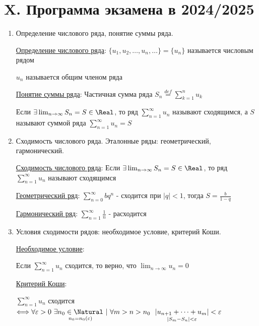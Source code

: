 \documentclass[12pt]{article}
\begin{document}
\clearpage

\section{X. Программа экзамена в 2024/2025}


\begin{enumerate}
\subsection{X.1. Числовые ряды.}

    \item Определение числового ряда, понятие суммы ряда.

    \hyperlink{numberseriesdefinition}{Определение числового ряда}: $\{u_1, u_2, \dots, u_n, \dots\} = \{u_n\}$ называется числовым рядом

    $u_n$ называется общим членом ряда
    
    \hyperlink{sumofseriesdefinition}{Понятие суммы ряда}: Частичная сумма ряда $S_n \stackrel{def}{=} \sum_{k = 1}^{n} u_k$

    Если $\exists \lim_{n \to\infty} S_n = S \in \Real$, то ряд $\sum_{n = 1}^\infty u_n$ называют сходящимся,
    а $S$ называют суммой ряда $\sum_{n = 1}^\infty u_n = S$

    \item Сходимость числового ряда. Эталонные ряды: геометрический, гармонический.

    \hyperlink{seriesconvergence}{Сходимость числового ряда}: Если $\exists \lim_{n \to\infty} S_n = S \in \Real$, то ряд $\sum_{n = 1}^\infty u_n$ называют сходящимся

    \hyperlink{geometricseries}{Геометрический ряд}: $\sum_{n = 0}^\infty b q^n$ - сходится при $|q| < 1$, тогда $S = \frac{b}{1 - q}$
    
    \hyperlink{harmonicseries}{Гармонический ряд}: $\sum_{n = 1}^\infty \frac{1}{n}$ - расходится

    \item Условия сходимости рядов: необходимое условие, критерий Коши.

    \hyperlink{necessarycondition}{Необходимое условие}: 

    \Ths Если $\sum_{n = 1}^\infty u_n$ сходится, то верно, что $\lim_{n \to \infty} u_n = 0$

    \hyperlink{cauchycriteria}{Критерий Коши}:

    \Ths $\sum_{n = 1}^\infty u_n$ сходится $\Longleftrightarrow \forall \varepsilon > 0 \ \exists \underset{n_0 = n_0 (\varepsilon)}{n_0 \in \Natural} \ | \ \forall m > n > n_0 \ \ \underset{|S_m - S_n| < \varepsilon}{|u_{n + 1} + \dots + u_m|} < \varepsilon$


\end{enumerate}
\end{document}
